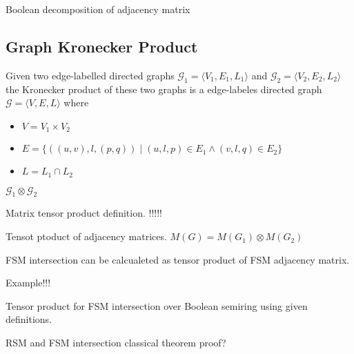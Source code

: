 Boolean decomposition of adjacency matrix

\subsection{Graph Kronecker Product}

\begin{definition}
Given two edge-labelled directed graphs $\mathcal{G}_1=\langle V_1, E_1, L_1 \rangle$ and $\mathcal{G}_2=\langle V_2, E_2, L_2 \rangle$ the Kronecker product of these two graphs is a edge-labeles directed graph $\mathcal{G}=\langle V, E, L \rangle$ where 
\begin{itemize}
	\item $V = V_1 \times V_2$
	\item $E = \{((u,v),l,(p,q)) \mid (u,l,p) \in E_1 \wedge (v,l,q) \in E_2 \}$
	\item $L = L_1 \cap L_2$
\end{itemize}
 $\mathcal{G}_1 \otimes \mathcal{G}_2$ 
\end{definition}


\begin{definition}
Matrix tensor product definition.
!!!!!
\end{definition}

Tensot ptoduct of adjacency matrices. $M(G) = M(G_1) \otimes M(G_2)$


FSM intersection can be calcualeted as tensor product of FSM adjacency matrix.

Example!!!

Tensor product for FSM intersection over Boolean semiring using given definitions.

RSM and FSM intersection classical theorem proof? 
